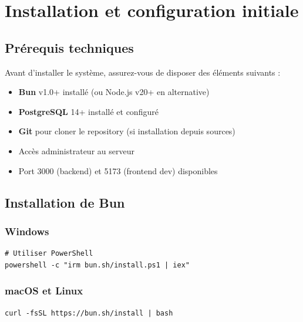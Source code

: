 \section{Installation et configuration initiale}

\subsection{Prérequis techniques}

Avant d'installer le système, assurez-vous de disposer des éléments suivants :

\begin{tcolorbox}[colback=blue!5!white,colframe=blue!75!black,title=Prérequis serveur]
\begin{itemize}[leftmargin=*]
    \item \textbf{Bun} v1.0+ installé (ou Node.js v20+ en alternative)
    \item \textbf{PostgreSQL} 14+ installé et configuré
    \item \textbf{Git} pour cloner le repository (si installation depuis sources)
    \item Accès administrateur au serveur
    \item Port 3000 (backend) et 5173 (frontend dev) disponibles
\end{itemize}
\end{tcolorbox}

\subsection{Installation de Bun}

\subsubsection{Windows}

\begin{lstlisting}[language={}, frame=single]
# Utiliser PowerShell
powershell -c "irm bun.sh/install.ps1 | iex"
\end{lstlisting}

\subsubsection{macOS et Linux}

\begin{lstlisting}[language={}, frame=single]
curl -fsSL https://bun.sh/install | bash
\end{lstlisting}

